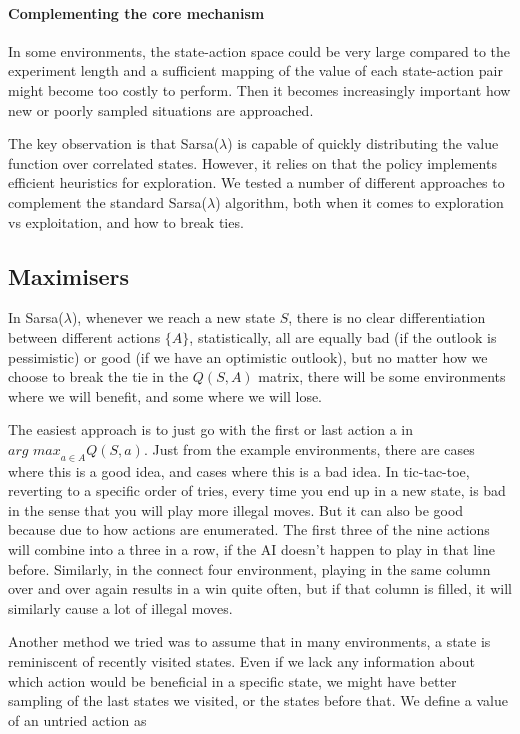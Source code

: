\paragraph{Complementing the core mechanism}
In some environments, the state-action space could be very large compared to the
experiment length and a sufficient mapping of the value of each state-action
pair might become too costly to perform. Then it becomes increasingly important
how new or poorly sampled situations are approached.

The key observation is that Sarsa($\lambda$) is capable of quickly distributing
the value function over correlated states. However, it relies on that the policy
implements efficient heuristics for exploration. We tested a number of different
approaches to complement the standard Sarsa($\lambda$) algorithm, both when it
comes to exploration vs exploitation, and how to break ties. 

\subsection{Maximisers}
In Sarsa($\lambda$), whenever we reach a new state $S$, there is no clear
differentiation between different actions $\{A\}$, statistically, all are
equally bad (if the outlook is pessimistic) or good (if we have an optimistic
outlook), but no matter how we choose to break the tie in the $Q(S,A)$ matrix,
there will be some environments where we will benefit, and some where we will
lose.

The easiest approach is to just go with the first or last action a in $\textit{arg
    max}_{a \in A} Q(S,a)$. Just from the example environments, there
are cases where this is a good idea, and cases where this is a bad idea. In tic-tac-toe, reverting to a specific order of tries, every time you end up in a new
state, is bad in the sense that you will play more illegal moves. But it can also
be good because due to how actions are enumerated. The first three of the nine
actions will combine into a three in a row, if the AI doesn't happen to play in
that line before. Similarly, in the connect four environment, playing in the
same column over and over again results in a win quite often, but if that column
is filled, it will similarly cause a lot of illegal moves.

Another method we tried was to assume that in many environments, a state is
reminiscent of recently visited states. Even if we lack any information about
which action would be beneficial in a specific state, we might have better
sampling of the last states we visited, or the states before that. We define a value of an untried action as


